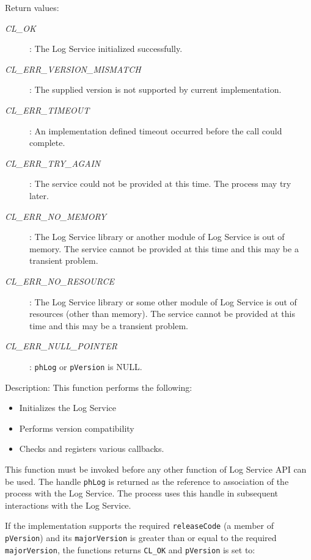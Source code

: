 \begin{flushleft}
\begin{Desc}
\begin{description}
\end{description}
\end{Desc}
\begin{Desc}
\item[Return values:]
\begin{description}
\item[{\em CL\_\-OK}]: The Log Service initialized successfully.
\item[{\em CL\_\-ERR\_\-VERSION\_\-MISMATCH}]: The supplied version is not supported by current implementation.
\item[{\em CL\_\-ERR\_\-TIMEOUT}]: An implementation defined timeout occurred before the call could complete.
\item[{\em CL\_\-ERR\_\-TRY\_\-AGAIN}]: The service could not be provided at this time. The process may try later.
\item[{\em CL\_\-ERR\_\-NO\_\-MEMORY}]: The Log Service library or another module of Log Service is out of memory. The service cannot 
be provided at this time and this may be a transient problem.
\item[{\em CL\_\-ERR\_\-NO\_\-RESOURCE}]:  The Log Service library or some other module of Log Service is out of resources 
(other than memory). The service cannot be provided at this time and this may be a transient problem.
\item[{\em CL\_\-ERR\_\-NULL\_\-POINTER}]: {\tt{phLog}} or {\tt{pVersion}} is NULL.
\end{description}
\end{Desc}
\begin{Desc}
\item[Description:] This function performs the following:
\begin{itemize}
\item
Initializes the Log Service
\item
Performs version compatibility
\item
Checks and registers various callbacks. 
\end{itemize}
This function must be invoked before any other function of Log Service API can be used. The handle {\tt{phLog}} is returned as the reference to
association of the process with the Log Service. The process uses this handle in subsequent interactions with the Log Service.
\par
If the implementation supports the required {\tt{releaseCode}} (a member of {\tt{pVersion}}) and its {\tt{majorVersion}} is greater than or equal to the 
required {\tt{majorVersion}}, the functions returns {\tt{CL\_\-OK}} and {\tt{pVersion}} is set to:

\end{Desc}
\end{flushleft}
